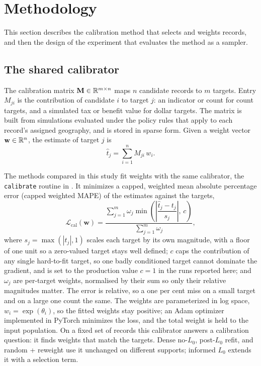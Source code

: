 \section{Methodology}
\label{sec:methodology}

This section describes the calibration method that selects and weights records, and then the design
of the experiment that evaluates the method as a sampler.

\subsection{The shared calibrator}

The calibration matrix $\mathbf{M} \in \mathbb{R}^{m \times n}$ maps $n$ candidate records to $m$ targets.
Entry $M_{ji}$ is the contribution of candidate $i$ to target $j$: an indicator or count for count
targets, and a simulated tax or benefit value for dollar targets. The matrix is built from
\policyengine{} simulations evaluated under the policy rules that apply to each record's assigned
geography, and is stored in sparse form. Given a weight vector $\mathbf{w} \in \mathbb{R}^n$, the estimate of
target $j$ is
\begin{equation}
    \hat{t}_j = \sum_{i=1}^{n} M_{ji}\, w_i.
    \label{eq:estimate}
\end{equation}

The methods compared in this study fit weights with the same calibrator, the \texttt{calibrate}
routine in \populace{}. It minimizes a capped, weighted mean absolute percentage error (capped weighted
MAPE) of the estimates against the targets,
\begin{equation}
    \mathcal{L}_{\mathrm{cal}}(\mathbf{w}) =
    \frac{\sum_{j=1}^{m} \omega_j \min\!\left(\left|\dfrac{\hat{t}_j - t_j}{s_j}\right|,\, c\right)}
         {\sum_{j=1}^{m} \omega_j},
    \label{eq:loss_cal}
\end{equation}
where $s_j = \max(|t_j|, 1)$ scales each target by its own magnitude, with a floor of one unit so a
zero-valued target stays well defined; $c$ caps the contribution of any single hard-to-fit target, so
one badly conditioned target cannot dominate the gradient, and is set to the production value $c = 1$ in
the runs reported here; and $\omega_j$ are
per-target weights, normalised by their sum so only their relative magnitudes matter. The error is
relative, so a one per cent miss on a small target and on a large one count the same. The weights are
parameterized in log space, $w_i = \exp(\theta_i)$, so the fitted weights stay positive; an Adam
optimizer \citep{kingma2015} implemented in PyTorch \citep{pytorch2019} minimizes the loss, and the
total weight is held to the input population. On a fixed set of records this calibrator answers a
calibration question: it finds weights that match the targets. Dense no-$L_0$, post-$L_0$ refit, and
random + reweight use it unchanged on different supports; informed $L_0$ extends it with a selection
term.

